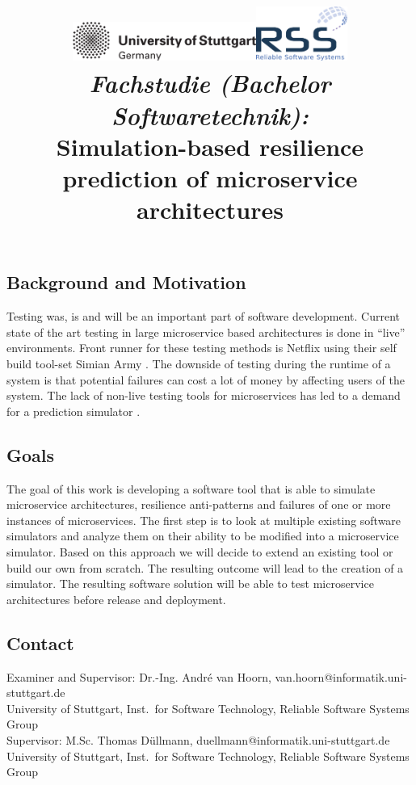 \documentclass[a4paper,12pt]{article}
\date{}
\title{
\includegraphics[width=6cm]{figures/stuttgart-vector.pdf}\hfill{\includegraphics[width=3cm]{figures/rss_logo.pdf}}
\quad \\ [0.5cm]
{\large \textit{Fachstudie (Bachelor Softwaretechnik):}} \\ [1mm]
{\Large Simulation-based resilience prediction of microservice architectures}
}
\begin{document}
	

\maketitle

\thispagestyle{empty}

\vspace{-2.5cm}


\subsection*{Background and Motivation}
	Testing was, is and will be an important part of software development. Current state of the art testing in large microservice based architectures is done in “live” environments. Front runner for these testing methods is Netflix using their self build tool-set Simian Army \cite{NSA}. The downside of testing during the runtime of a system is that potential failures can cost a lot of money by affecting users of the system. The lack of non-live testing tools for microservices has led to a demand for a prediction simulator \cite{CLOUD}.


\subsection*{Goals}
	The goal of this work is developing a software tool that is able to simulate microservice architectures, resilience anti-patterns and failures of one or more instances of microservices. The first step is to look at multiple existing software simulators and analyze them on their ability to be modified into a microservice simulator. Based on this approach we will decide to extend an existing tool or build our own from scratch. The resulting outcome will lead to the creation of a simulator. The resulting software solution will be able to test microservice architectures before release and deployment.

\begin{scriptsize}


\end{scriptsize}

\subsection*{Contact}
Examiner and Supervisor: Dr.-Ing. André van Hoorn, van.hoorn@informatik.uni-stuttgart.de \\
University of Stuttgart, Inst.\ for Software Technology, Reliable Software Systems Group \\ \newline
Supervisor: M.Sc. Thomas Düllmann, duellmann@informatik.uni-stuttgart.de \\
University of Stuttgart, Inst.\ for Software Technology, Reliable Software Systems Group \\
\end{document}
